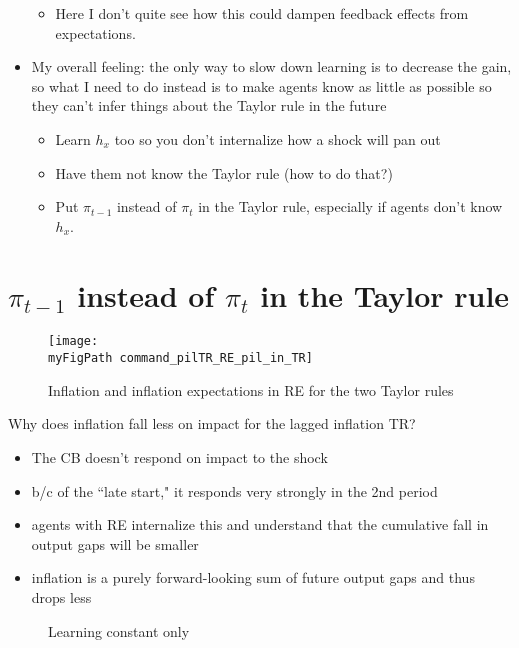 \documentclass[11pt]{article}
\def \myFigPath {../figures/}
\renewcommand{\[}{\begin{equation}}
\renewcommand{\]}{\end{equation}}
\def\mySmallerFigScale{0.18}
\def\myPointFourteenFigScale{0.14}
\begin{document}
\begin{itemize}
\begin{itemize}
\item Here I don't quite see how this could dampen feedback effects from expectations.
\end{itemize}
\item My overall feeling: the only way to slow down learning is to decrease the gain, so what I need to do instead is to make agents know as little as possible so they can't infer things about the Taylor rule in the future
\begin{itemize}
\item Learn $h_x$ too so you don't internalize how a shock will pan out
\item Have them not know the Taylor rule (how to do that?)
\item Put $\pi_{t-1}$ instead of $\pi_t$ in the Taylor rule, especially if agents don't know $h_x$.
\end{itemize}

\end{itemize}


\section{$\pi_{t-1}$ instead of $\pi_t$ in the Taylor rule}

\begin{figure}[h!]
\texttt{[image: \\myFigPath command\_pilTR\_RE\_pil\_in\_TR]}
\caption{Inflation and inflation expectations in RE for the two Taylor rules}
\end{figure}

Why does inflation fall less on impact for the lagged inflation TR?
\begin{itemize}
\item The CB doesn't respond on impact to the shock
\item b/c of the ``late start," it responds very strongly in the 2nd period
\item agents with RE internalize this and understand that the cumulative fall in output gaps will be smaller
\item inflation is a purely forward-looking sum of future output gaps and thus drops less
\end{itemize}


\begin{figure}[h!]
\caption{Learning constant only}
\end{figure}
\end{document}
